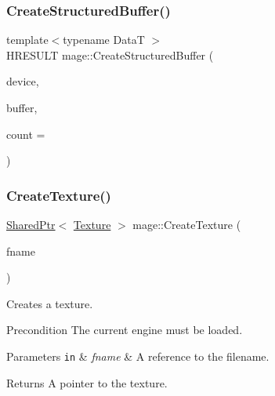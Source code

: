 \hypertarget{namespacemage_a9090692dded3dfa6abbcb2023b1e6327}{}\label{namespacemage_a9090692dded3dfa6abbcb2023b1e6327} 
\subsubsection{\texorpdfstring{Create\+Structured\+Buffer()}{CreateStructuredBuffer()}}
{\footnotesize\ttfamily template$<$typename DataT $>$ \\
H\+R\+E\+S\+U\+LT mage\+::\+Create\+Structured\+Buffer (\begin{DoxyParamCaption}\item[{I\+D3\+D11\+Device2 $\ast$}]{device,  }\item[{I\+D3\+D11\+Buffer $\ast$$\ast$}]{buffer,  }\item[{size\+\_\+t}]{count = {} }\end{DoxyParamCaption})}

\hypertarget{namespacemage_ac27913e621bde0fd01312183aafaaca0}{}\label{namespacemage_ac27913e621bde0fd01312183aafaaca0} 
\subsubsection{\texorpdfstring{Create\+Texture()}{CreateTexture()}}
{\footnotesize\ttfamily \hyperlink{namespacemage_a1e01ae66713838a7a67d30e44c67703e}{Shared\+Ptr}$<$ \hyperlink{classmage_1_1_texture}{Texture} $>$ mage\+::\+Create\+Texture (\begin{DoxyParamCaption}\item[{const wstring \&}]{fname }\end{DoxyParamCaption})}

Creates a texture.

\begin{DoxyPrecond}{Precondition}
The current engine must be loaded. 
\end{DoxyPrecond}

\begin{DoxyParams}[1]{Parameters}
\mbox{\tt in}  & {\em fname} & A reference to the filename. \\
\hline
\end{DoxyParams}
\begin{DoxyReturn}{Returns}
A pointer to the texture. 
\end{DoxyReturn}

